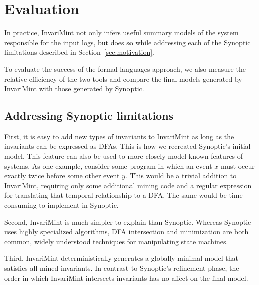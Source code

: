 \section{Evaluation}
\label{sec:evaluation}
In practice, InvariMint not only infers useful summary models of the system
responsible for the input logs, but does so while addressing each of the
Synoptic limitations described in Section~\ref{sec:motivation}.

To evaluate the success of the formal languages approach, we also measure 
the relative efficiency of the two tools and compare
the final models generated by InvariMint with those generated by Synoptic.


\subsection{Addressing Synoptic limitations}

First, it is easy to add new types of invariants to InvariMint
as long as the invariants can be expressed as DFAs. This is how we recreated
Synoptic's initial model. This feature can also be used to more closely model
known features of systems. As one
example, consider some program in which an event $x$ must occur exactly twice before
some other event $y$. This would be a trivial addition to InvariMint, requiring
only some additional mining code and a regular expression for translating that
temporal relationship to a DFA. The same would be time
consuming to implement in Synoptic.

Second, InvariMint is much simpler to explain than Synoptic.
Whereas Synoptic uses highly specialized algorithms, DFA intersection and
minimization are both common, widely understood techniques for manipulating
state machines.

Third, InvariMint deterministically generates a globally minimal model that
satisfies all mined invariants. In contrast to Synoptic's refinement phase, the
order in which InvariMint intersects invariants has no affect on the final
model.

